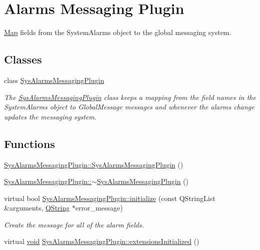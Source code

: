 \hypertarget{group___system}{\section{Alarms Messaging Plugin}
\label{group___system}
}


\hyperlink{class_map}{Map} fields from the System\-Alarms object to the global messaging system.  


\subsection*{Classes}
\begin{DoxyCompactItemize}
\item 
class \hyperlink{class_sys_alarms_messaging_plugin}{Sys\-Alarms\-Messaging\-Plugin}
\begin{DoxyCompactList}\small\item\em The \hyperlink{class_sys_alarms_messaging_plugin}{Sys\-Alarms\-Messaging\-Plugin} class keeps a mapping from the field names in the System\-Alarms object to Global\-Message messages and whenever the alarms change updates the messaging system. \end{DoxyCompactList}\end{DoxyCompactItemize}
\subsection*{Functions}
\begin{DoxyCompactItemize}
\item 
\hyperlink{group___system_ga28d933c66393f5dcb0a9f5be71c29476}{Sys\-Alarms\-Messaging\-Plugin\-::\-Sys\-Alarms\-Messaging\-Plugin} ()
\item 
\hyperlink{group___system_gadb9f2fd8f551a876369ad14edccafb77}{Sys\-Alarms\-Messaging\-Plugin\-::$\sim$\-Sys\-Alarms\-Messaging\-Plugin} ()
\item 
virtual bool \hyperlink{group___system_gaee946a3db8f69ee44247462593349d71}{Sys\-Alarms\-Messaging\-Plugin\-::initialize} (const Q\-String\-List \&arguments, \hyperlink{group___u_a_v_objects_plugin_gab9d252f49c333c94a72f97ce3105a32d}{Q\-String} $\ast$error\-\_\-message)
\begin{DoxyCompactList}\small\item\em Create the message for all of the alarm fields. \end{DoxyCompactList}\item 
virtual \hyperlink{group___u_a_v_objects_plugin_ga444cf2ff3f0ecbe028adce838d373f5c}{void} \hyperlink{group___system_gafbeee237df9ed93b1f831cf2f8770055}{Sys\-Alarms\-Messaging\-Plugin\-::extensions\-Initialized} ()
\end{DoxyCompactItemize}


